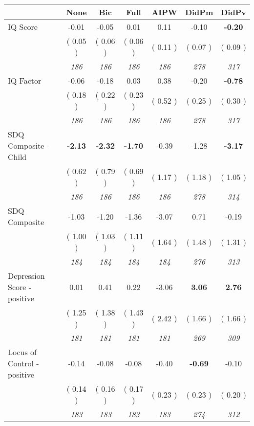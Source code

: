 \begin{tabular}{l c c c c c c}
\toprule
 & None & Bic & Full & AIPW & DidPm & DidPv \\
\midrule
IQ Score &     -0.01 &     -0.05 &      0.01 &      0.11 &     -0.10 & \textbf{     -0.20 } \\
& (     0.05 ) & (     0.06 ) & (     0.06 ) & (     0.11 ) & (     0.07 ) & (     0.09 ) \\
& \textit{ 186 } & \textit{ 186 } & \textit{ 186 } & \textit{ 186 } & \textit{ 278 } & \textit{ 317 } \\
IQ Factor &     -0.06 &     -0.18 &      0.03 &      0.38 &     -0.20 & \textbf{     -0.78 } \\
& (     0.18 ) & (     0.22 ) & (     0.23 ) & (     0.52 ) & (     0.25 ) & (     0.30 ) \\
& \textit{ 186 } & \textit{ 186 } & \textit{ 186 } & \textit{ 186 } & \textit{ 278 } & \textit{ 317 } \\
SDQ Composite - Child & \textbf{     -2.13 } & \textbf{     -2.32 } & \textbf{     -1.70 } &     -0.39 &     -1.28 & \textbf{     -3.17 } \\
& (     0.62 ) & (     0.79 ) & (     0.69 ) & (     1.17 ) & (     1.18 ) & (     1.05 ) \\
& \textit{ 186 } & \textit{ 186 } & \textit{ 186 } & \textit{ 186 } & \textit{ 278 } & \textit{ 314 } \\
SDQ Composite &     -1.03 &     -1.20 &     -1.36 &     -3.07 &      0.71 &     -0.19 \\
& (     1.00 ) & (     1.03 ) & (     1.11 ) & (     1.64 ) & (     1.48 ) & (     1.31 ) \\
& \textit{ 184 } & \textit{ 184 } & \textit{ 184 } & \textit{ 184 } & \textit{ 276 } & \textit{ 313 } \\
Depression Score - positive &      0.01 &      0.41 &      0.22 &     -3.06 & \textbf{      3.06 } & \textbf{      2.76 } \\
& (     1.25 ) & (     1.38 ) & (     1.43 ) & (     2.42 ) & (     1.66 ) & (     1.66 ) \\
& \textit{ 181 } & \textit{ 181 } & \textit{ 181 } & \textit{ 181 } & \textit{ 269 } & \textit{ 309 } \\
Locus of Control - positive &     -0.14 &     -0.08 &     -0.08 &     -0.40 & \textbf{     -0.69 } &     -0.10 \\
& (     0.14 ) & (     0.16 ) & (     0.17 ) & (     0.23 ) & (     0.23 ) & (     0.20 ) \\
& \textit{ 183 } & \textit{ 183 } & \textit{ 183 } & \textit{ 183 } & \textit{ 274 } & \textit{ 312 } \\

\end{tabular}
